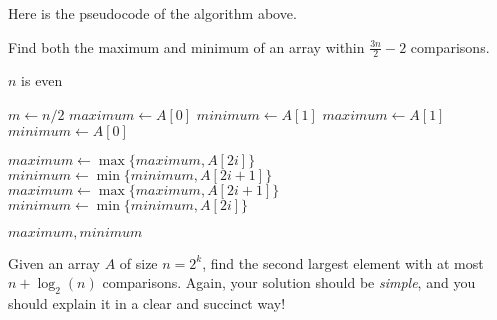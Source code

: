 Here is the pseudocode of the algorithm above.
\begin{algorithm}
    \caption{Find both the maximum and minimum of an array within $\frac{3n}{2} - 2$ comparisons.}
    \begin{algorithmic}
        \Ensure $n$ is even
        
        \State $m \gets n / 2$
            \State $maximum \gets A[0]$
            \State $minimum \gets A[1]$
        \Else
            \State $maximum \gets A[1]$
            \State $minimum \gets A[0]$
        \EndIf
        
                \State $maximum \gets \max\{maximum, A[2i]\}$
                \State $minimum \gets \min\{minimum, A[2i + 1]\}$
            \Else
                \State $maximum \gets \max\{maximum, A[2i + 1]\}$
                \State $minimum \gets \min\{minimum, A[2i]\}$
            \EndIf
        \EndFor
        
        \Return $maximum, minimum$
        \EndFunction
    \end{algorithmic}
\end{algorithm}

\newpage

\begin{thm}{}{}
    Given an array $A$ of size $n = 2^k$, find the second largest element with at most $n + \log_2(n)$ comparisons. Again, your solution should be \textit{simple}, and you should explain it in a clear and succinct way!
\end{thm}

